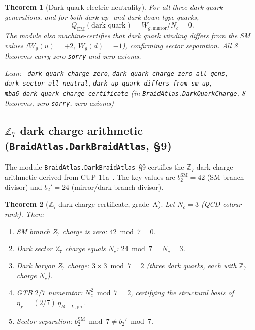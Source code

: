 \documentclass[11pt,a4paper]{article}
\newenvironment{leanref}%
  {\par\smallskip\noindent\begingroup\raggedright\textup{Lean:}~}%
  {\par\endgroup}
\newtheorem{theorem}{Theorem}[section]
\theoremstyle{definition}
\begin{document}
\begin{theorem}[Dark quark electric neutrality]\label{thm:dark_quark_neutral}
For all three dark-quark generations, and for both dark up- and
dark down-type quarks,
\[
  Q_\mathrm{EM}(\text{dark quark}) = W_{g,\mathrm{mirror}} / N_c = 0.
\]
The module also machine-certifies that dark quark winding differs from
the SM values ($W_g(u) = +2$, $W_g(d) = -1$), confirming sector separation.
All 8 theorems carry zero \texttt{sorry} and zero axioms.
\begin{leanref}
\lstinline|dark_quark_charge_zero|,
\lstinline|dark_quark_charge_zero_all_gens|,
\lstinline|dark_sector_all_neutral|,
\lstinline|dark_up_quark_differs_from_sm_up|,
\lstinline|mba6_dark_quark_charge_certificate|
\textup{(in \texttt{BraidAtlas.DarkQuarkCharge}, 8 theorems, zero \texttt{sorry},
zero axioms)}
\end{leanref}
\end{theorem}

\subsection{$\mathbb{Z}_7$ dark charge arithmetic
            (\texttt{BraidAtlas.DarkBraidAtlas}, \S9)}
\label{subsec:z7_dark_charge_lean}

The module \texttt{BraidAtlas.DarkBraidAtlas}~\S9 certifies the $\mathbb{Z}_7$ dark
charge arithmetic derived from CUP-11a~\cite{SpivackCUP}.
The key values are $b_2^{\mathrm{SM}} = 42$ (SM branch divisor) and
$b_2' = 24$ (mirror/dark branch divisor).

\begin{theorem}[$\mathbb{Z}_7$ dark charge certificate, grade~A]\label{thm:z7_dark_charge}
Let $N_c = 3$ (QCD colour rank). Then:
\begin{enumerate}
\item \emph{SM branch Z$_7$ charge is zero:} $42 \bmod 7 = 0$.
\item \emph{Dark sector Z$_7$ charge equals $N_c$:} $24 \bmod 7 = N_c = 3$.
\item \emph{Dark baryon Z$_7$ charge:} $3 \times 3 \bmod 7 = 2$
      (three dark quarks, each with $\mathbb{Z}_7$ charge $N_c$).
\item \emph{GTB $2/7$ numerator:} $N_c^2 \bmod 7 = 2$,
      certifying the structural basis of $\eta_\chi = (2/7)\,\eta_{B+L,\mathrm{pre}}$.
\item \emph{Sector separation:} $b_2^{\mathrm{SM}} \bmod 7 \neq b_2' \bmod 7$.
\end{enumerate}
\end{theorem}
\end{document}
